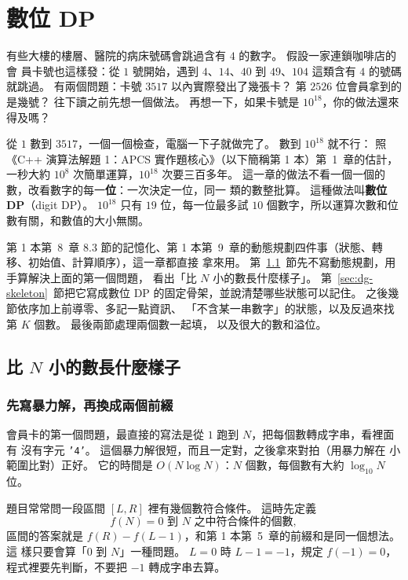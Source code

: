 \chapter{數位 DP}
\label{ch:digitdp}

有些大樓的樓層、醫院的病床號碼會跳過含有 $4$ 的數字。 假設一家連鎖咖啡店的會
員卡號也這樣發：從 $1$ 號開始，遇到 $4$、$14$、$40$ 到 $49$、$104$ 這類含有
$4$ 的號碼就跳過。 有兩個問題：卡號 $3517$ 以內實際發出了幾張卡？ 第 $2526$
位會員拿到的是幾號？ 往下讀之前先想一個做法。 再想一下，如果卡號是
$10^{18}$，你的做法還來得及嗎？

從 $1$ 數到 $3517$，一個一個檢查，電腦一下子就做完了。 數到 $10^{18}$ 就不行：
照《C++ 演算法解題 1：APCS 實作題核心》（以下簡稱第 1 本）第~1~章的估計，一秒大約
$10^8$ 次簡單運算，$10^{18}$ 次要三百多年。
這一章的做法不看一個一個的數，改看數字的每一\textbf{位}：一次決定一位，同一
類的數整批算。 這種做法叫\textbf{數位 DP}（digit DP）。 $10^{18}$ 只有 $19$
位，每一位最多試 $10$ 個數字，所以運算次數和位數有關，和數值的大小無關。

第 1 本第~8~章 8.3 節的記憶化、第 1 本第~9~章的動態規劃四件事（狀態、轉移、初始值、計算順序），這一章都直接
拿來用。 第~\ref{sec:dg-prefix}~節先不寫動態規劃，用手算解決上面的第一個問題，
看出「比 $N$ 小的數長什麼樣子」。 第~\ref{sec:dg-skeleton}~節把它寫成數位 DP
的固定骨架，並說清楚哪些狀態可以記住。 之後幾節依序加上前導零、多記一點資訊、
「不含某一串數字」的狀態，以及反過來找第 $K$ 個數。 最後兩節處理兩個數一起填，
以及很大的數和溢位。

\section{比 \texorpdfstring{$N$}{N} 小的數長什麼樣子}
\label{sec:dg-prefix}

\subsection{先寫暴力解，再換成兩個前綴}

會員卡的第一個問題，最直接的寫法是從 $1$ 跑到 $N$，把每個數轉成字串，看裡面有
沒有字元 \texttt{'4'}。 這個暴力解很短，而且一定對，之後拿來對拍（用暴力解在
小範圍比對）正好。 它的時間是 $O(N \log N)$：$N$ 個數，每個數有大約
$\log_{10} N$ 位。

題目常常問一段區間 $[L, R]$ 裡有幾個數符合條件。 這時先定義
\[
f(N) = 0 \text{ 到 } N \text{ 之中符合條件的個數},
\]
區間的答案就是 $f(R) - f(L - 1)$，和第 1 本第~5~章的前綴和是同一個想法。 這
樣只要會算「$0$ 到 $N$」一種問題。 $L = 0$ 時 $L - 1 = -1$，規定 $f(-1) = 0$，
程式裡要先判斷，不要把 $-1$ 轉成字串去算。

